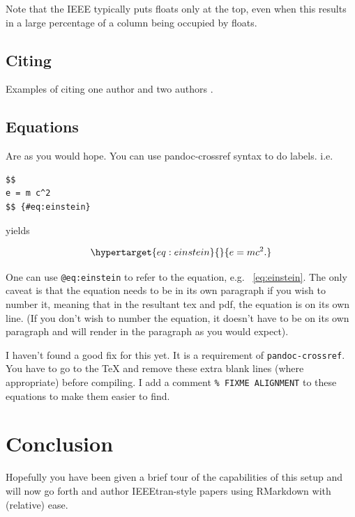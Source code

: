 \documentclass[a4paper,conference]{IEEEtran}
\let\citep\cite
\begin{document}
Note that the IEEE typically puts floats only at the top, even when this
results in a large percentage of a column being occupied by floats.

\hypertarget{sec:citing}{%
\subsection{Citing}\label{sec:citing}}

Examples of citing one author \citep{Besag1974} and two authors
\citep{Besag1974, Besag1986}.

\hypertarget{sec:equations}{%
\subsection{Equations}\label{sec:equations}}

Are as you would hope. You can use pandoc-crossref syntax to do labels.
i.e.

\begin{verbatim}
$$
e = m c^2
$$ {#eq:einstein}
\end{verbatim}

yields

\begin{equation}\protect\hypertarget{eq:einstein}{}{
e = m c^2.
}\end{equation}

One can use \texttt{@eq:einstein} to refer to the equation, e.g.
~\ref{eq:einstein}. The only caveat is that the equation needs to be in
its own paragraph if you wish to number it, meaning that in the
resultant tex and pdf, the equation is on its own line. (If you don't
wish to number the equation, it doesn't have to be on its own paragraph
and will render in the paragraph as you would expect).

I haven't found a good fix for this yet. It is a requirement of
\texttt{pandoc-crossref}. You have to go to the TeX and remove these
extra blank lines (where appropriate) before compiling. I add a comment
\texttt{\%\ FIXME\ ALIGNMENT} to these equations to make them easier to
find.

\hypertarget{sec:conclusion}{%
\section{Conclusion}\label{sec:conclusion}}

Hopefully you have been given a brief tour of the capabilities of this
setup and will now go forth and author IEEEtran-style papers using
RMarkdown with (relative) ease.
\end{document}
